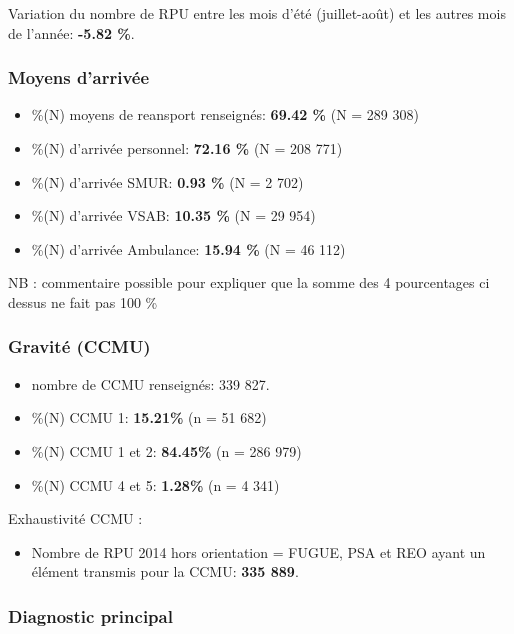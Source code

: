 \documentclass[]{article}
\begin{document}
Variation du nombre de RPU entre les mois d'été (juillet-août) et les
autres mois de l'année: \textbf{-5.82 \%}.

\subsubsection{Moyens d'arrivée}\label{moyens-darrivee}

\begin{itemize}
\itemsep1pt\parskip0pt
\item
  \%(N) moyens de reansport renseignés: \textbf{69.42 \%} (N = 289 308)
\item
  \%(N) d'arrivée personnel: \textbf{72.16 \%} (N = 208 771)
\item
  \%(N) d'arrivée SMUR: \textbf{0.93 \%} (N = 2 702)
\item
  \%(N) d'arrivée VSAB: \textbf{10.35 \%} (N = 29 954)
\item
  \%(N) d'arrivée Ambulance: \textbf{15.94 \%} (N = 46 112)
\end{itemize}

NB : commentaire possible pour expliquer que la somme des 4 pourcentages
ci dessus ne fait pas 100 \%

\subsubsection{Gravité (CCMU)}\label{gravite-ccmu}

\begin{itemize}
\itemsep1pt\parskip0pt
\item
  nombre de CCMU renseignés: 339 827.
\item
  \%(N) CCMU 1: \textbf{15.21\%} (n = 51 682)
\item
  \%(N) CCMU 1 et 2: \textbf{84.45\%} (n = 286 979)
\item
  \%(N) CCMU 4 et 5: \textbf{1.28\%} (n = 4 341)
\end{itemize}

Exhaustivité CCMU :

\begin{itemize}
\itemsep1pt\parskip0pt
\item
  Nombre de RPU 2014 hors orientation = FUGUE, PSA et REO ayant un
  élément transmis pour la CCMU: \textbf{335 889}.
\end{itemize}

\subsubsection{Diagnostic principal}\label{diagnostic-principal}
\end{document}
